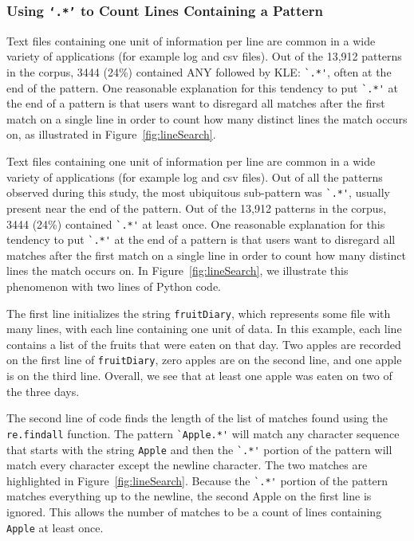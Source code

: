 \subsubsection{Using {\tt`.*'} to Count Lines Containing a Pattern}
Text files containing one unit of information per line are common in a wide variety of applications (for example log and csv files).  Out of the 13,912 patterns in the corpus, 3444 (24\%) contained ANY followed by KLE: \verb!`.*'!, often at the end of the pattern.
One reasonable explanation for this tendency to put \verb!`.*'! at the end of a pattern is that users want to disregard all matches after the first match on a single line in order to count how many distinct lines the match occurs on, as illustrated in Figure~\ref{fig:lineSearch}.

Text files containing one unit of information per line are common in a wide variety of applications (for example log and csv files).  Out of all the patterns observed during this study, the most ubiquitous sub-pattern was \verb!`.*'!, usually present near the end of the pattern.  Out of the 13,912 patterns in the corpus, 3444 (24\%) contained \verb!`.*'! at least once.
One reasonable explanation for this tendency to put \verb!`.*'! at the end of a pattern is that users want to disregard all matches after the first match on a single line in order to count how many distinct lines the match occurs on.  In Figure~\ref{fig:lineSearch}, we illustrate this phenomenon with two lines of Python code.

The first line initializes the string {\tt fruitDiary}, which represents some file with many lines, with each line containing one unit of data.  In this example, each line contains a list of the fruits that were eaten on that day.  Two apples are recorded on the first line of {\tt fruitDiary}, zero apples are on the second line, and one apple is on the third line.  Overall, we see that at least one apple was eaten on two of the three days.

The second line of code finds the length of the list of matches found using the {\tt re.findall} function.  The pattern \verb!`Apple.*'! will match any character sequence that starts with the string {\tt Apple} and then the \verb!`.*'! portion of the pattern will match every character except the newline character.  The two matches are highlighted in Figure~\ref{fig:lineSearch}. Because the \verb!`.*'! portion of the pattern matches everything up to the newline, the second Apple on the first line is ignored.  This allows the number of matches to be a count of lines containing {\tt Apple} at least once.

